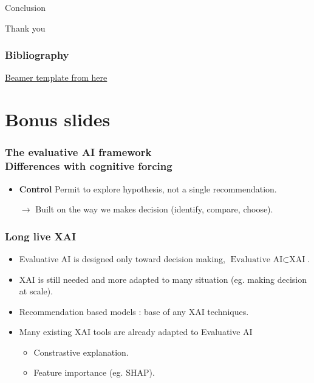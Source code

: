 \documentclass[compress,12pt]{beamer}
\begin{document}
\End
\begin{frame}[standout]
      \centering\large
      Conclusion
\end{frame}
\begin{frame}
      \centering\LARGE
      Thank you
\end{frame}

\begin{frame}
      \frametitle{Bibliography}
      \scriptsize{
            
            
            \href{https://github.com/piazzai/arguelles}{Beamer template from here \faGithub} \\
      }
\end{frame}

\section{Bonus slides}
\begin{frame}
      \frametitle{The evaluative AI framework \\ \normalsize Differences with cognitive forcing}
      \begin{itemize}
            \item \textbf{Control} Permit to explore hypothesis, not a single recommendation.
            \item [$\rightarrow$] Built on the way we makes decision (identify, compare, choose).
      \end{itemize}
\end{frame}
\begin{frame}
      \frametitle{Long live XAI}
      \begin{itemize}
            \item Evaluative AI is designed only toward decision making, $ \text{Evaluative AI} \subset \text{XAI} $.
            \item XAI is still needed and more adapted to many situation (eg. making decision at scale).
            \item Recommendation based models : base of any XAI techniques.
            \item Many existing XAI tools are already adapted to Evaluative AI \begin{itemize}
                  \item Constrastive explanation.
                  \item Feature importance (eg. SHAP).
            \end{itemize}
      \end{itemize}
\end{frame}
\end{document}
